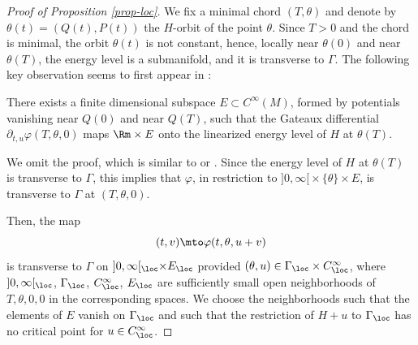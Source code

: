 \begin{proof}[Proof of Proposition \ref{prop-loc}]
We fix a minimal chord $(T,\theta )$ and denote by $\theta(t)=(Q(t), P(t))$ the $H$-orbit of the point $\theta$.
Since $T>0$ and the chord is minimal, the orbit $\theta(t)$ is not constant, hence, locally near $\theta(0)$ and near $\theta(T)$, the energy level is a submanifold,
and it is
transverse to $\Gamma$.
The following key observation seems to first appear in \cite[Lem.\,2]{A82}:

\begin{lem}
There exists a finite dimensional subspace $E\subset C^{\infty}(M)$, formed by potentials vanishing near $Q(0)$ and near $Q(T)$,
such that the Gateaux differential
$\partial_{t,u}\varphi(T,\theta, 0)
$
maps $\Rm\times E$ onto the linearized energy level of $H$ at
$\theta(T)$.
\end{lem}

We omit the proof, which is similar to \cite[Lem.\,2]{A82} or \cite[Lem.\,7]{AB2}.
Since the energy level of $H$ at $\theta(T)$ is transverse to $\Gamma$, this implies that $\varphi$, in restriction
to \hbox{$]0, \infty[{}\times \{\theta\}\times E$}, is transverse to $\Gamma$ at $(T,\theta,0)$.

Then, the map
\[
(t,v)\mto \varphi(t, \theta, u+v)
\]
is transverse to $\Gamma$ on $]0, \infty[_{\loc}\times E_{\loc}$
provided $(\theta,u)\in \Gamma_{\loc}\times C^{\infty}_{\loc}$, where $]0, \infty[_{\loc}$, $\Gamma_{\loc}$, $C^{\infty}_{\loc}$, $E_{\loc}$
are sufficiently small open neighborhoods of $T,\theta, 0,0$ in the corresponding spaces.
We choose the neighborhoods such that the elements of $E$ vanish on $\Gamma_{\loc}$ and such that the restriction of
$ H+u$ to $\Gamma_{\loc}$ has no critical point for $u\in C^{\infty}_{\loc}$.


\end{proof}
